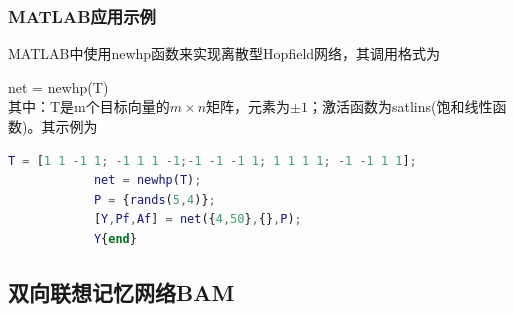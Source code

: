 {        \subsubsection{MATLAB应用示例}
            \par
            MATLAB中使用newhp函数来实现离散型Hopfield网络，其调用格式为
            \par
            net = newhp(T)\\
            其中：T是m个目标向量的$m\times n$矩阵，元素为$\pm 1$；激活函数为satlins(饱和线性函数)。其示例为
            \begin{lstlisting}[language = Matlab]
            T = [1 1 -1 1; -1 1 1 -1;-1 -1 -1 1; 1 1 1 1; -1 -1 1 1];
            net = newhp(T);
            P = {rands(5,4)};
            [Y,Pf,Af] = net({4,50},{},P);
            Y{end}
            \end{lstlisting}

    \subsection{双向联想记忆网络BAM}
}
